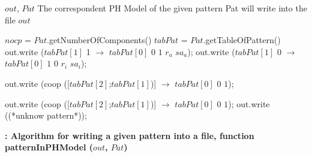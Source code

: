 
\begin{algorithm}
\begin{algorithmic}[H]

\REQUIRE $out$, $Pat$ 
\ENSURE The correspondent PH Model of the given pattern Pat will write into the file $out$

\STATE $nocp$ = $Pat$.getNumberOfComponents() 
\STATE $tabPat$ = $Pat$.getTableOfPattern() 
  \STATE out.write ($tabPat[1]$ 1 $\rightarrow$ $tabPat[0]$ $0$ $1$ $r_{a}$ $sa_{a}$);       
\ENDCASE
{}
  \STATE out.write ($tabPat[1]$ 0 $\rightarrow$ $tabPat[0]$ $1$ $0$ $r_{i}$ $sa_{i}$);    

\ENDSWITCH
   
   
\ENDCASE

   \STATE out.write (coop ([$tabPat[2]$;$tabPat[1]$)] $\rightarrow$ $tabPat[0]$ $0$ $1$); 
        
\ENDCASE
{}
  \STATE out.write (coop ([$tabPat[2]$;$tabPat[1]$)] $\rightarrow$ $tabPat[0]$ $0$ $1$); 
\DEFAULT
 \STATE out.write ((*unknow pattern*));
 \ENDDEFAULT
\ENDSWITCH
   
   
\ENDCASE

\ENDSWITCH

\end{algorithmic}
\caption{\bf: Algorithm for writing a given pattern into a file, function patternInPHModel ($out$, $Pat$)} \label{PHModelGeneration}
\end{algorithm}


